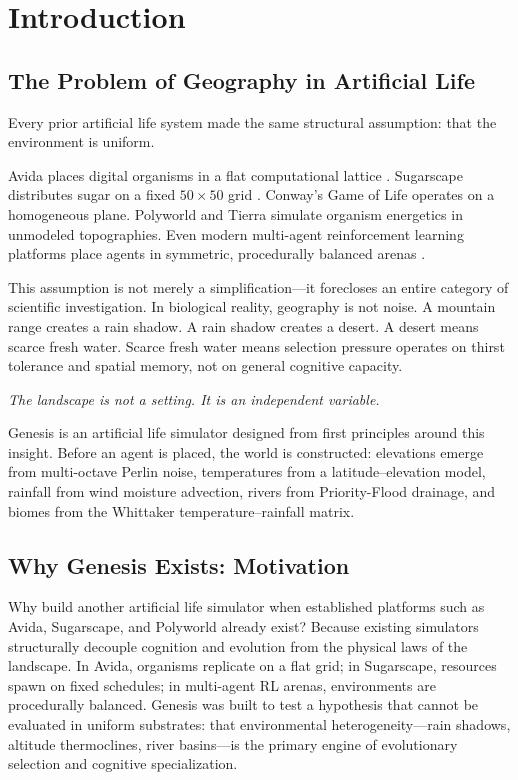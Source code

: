 \documentclass[12pt,a4paper]{article}
\begin{document}
\clearpage
\tableofcontents
\clearpage

\section{Introduction}

\subsection{The Problem of Geography in Artificial Life}

Every prior artificial life system made the same structural assumption: that the environment is uniform.

Avida places digital organisms in a flat computational lattice \cite{lenski2003,ofria2004}. Sugarscape distributes sugar on a fixed $50{\times}50$ grid \cite{epstein1996}. Conway's Game of Life operates on a homogeneous plane. Polyworld \cite{yaeger1994} and Tierra \cite{ray1991} simulate organism energetics in unmodeled topographies. Even modern multi-agent reinforcement learning platforms place agents in symmetric, procedurally balanced arenas \cite{baker2020}.

This assumption is not merely a simplification---it forecloses an entire category of scientific investigation. In biological reality, geography is not noise. A mountain range creates a rain shadow. A rain shadow creates a desert. A desert means scarce fresh water. Scarce fresh water means selection pressure operates on thirst tolerance and spatial memory, not on general cognitive capacity.

\textit{The landscape is not a setting. It is an independent variable.}

Genesis is an artificial life simulator designed from first principles around this insight. Before an agent is placed, the world is constructed: elevations emerge from multi-octave Perlin noise, temperatures from a latitude--elevation model, rainfall from wind moisture advection, rivers from Priority-Flood drainage, and biomes from the Whittaker temperature--rainfall matrix.

\subsection{Why Genesis Exists: Motivation}

Why build another artificial life simulator when established platforms such as Avida, Sugarscape, and Polyworld already exist? Because existing simulators structurally decouple cognition and evolution from the physical laws of the landscape. In Avida, organisms replicate on a flat grid; in Sugarscape, resources spawn on fixed schedules; in multi-agent RL arenas, environments are procedurally balanced. Genesis was built to test a hypothesis that cannot be evaluated in uniform substrates: that environmental heterogeneity---rain shadows, altitude thermoclines, river basins---is the primary engine of evolutionary selection and cognitive specialization.
\end{document}
